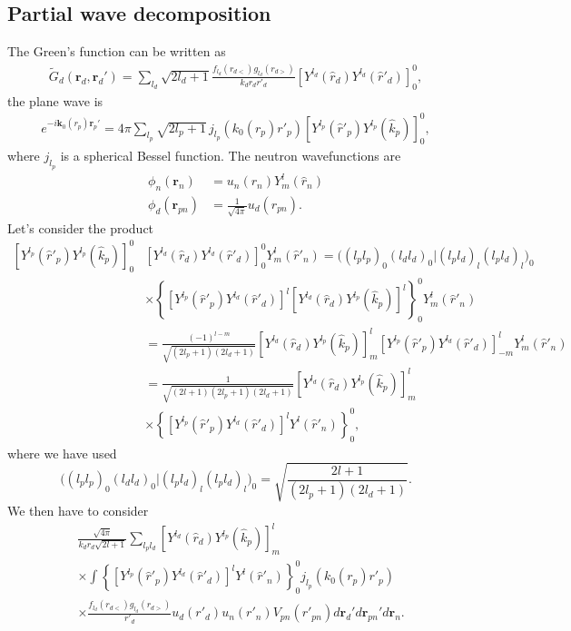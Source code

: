 \documentclass[a4paper,11pt]{article}
\begin{document}
\subsection{Partial wave decomposition}

The Green's function can be written as
\begin{align}\label{eq44}
\tilde G_d(\mathbf r_d,\mathbf r_d')=\sum_{l_d}\sqrt{2l_d+1}\frac{f_{l_d}(r_{d<})g_{l_d}(r_{d>})}{k_dr_dr'_d}\left[Y^{l_d}(\hat r_d) Y^{l_d}(\hat r'_d)\right]^0_0,
\end{align}
the plane wave is
\begin{align}\label{eq45}
e^{-i\mathbf k_0(r_p)\mathbf r_p'}=4\pi\sum_{l_p}\sqrt{2l_p+1}\,j_{l_p}(k_0(r_p) r'_p)\left[Y^{l_p}(\hat r'_p) Y^{l_p}(\hat k_p)\right]^0_0,
\end{align}
where $j_{l_p}$ is a spherical Bessel function.  The neutron wavefunctions are
\begin{align}\label{eq38}
\nonumber \phi_n(\mathbf{r}_n)&=u_n(r_n)Y^{l}_{m}(\hat r_n)\\
\phi_d(\mathbf{r}_{pn})&=\frac{1}{\sqrt{4\pi}}u_d(r_{pn}).
\end{align}
Let's consider the product
\begin{align}\label{eq46}
\nonumber\left[Y^{l_p}(\hat r'_p) Y^{l_p}(\hat k_p)\right]^0_0&\left[Y^{l_d}(\hat r_d) Y^{l_d}(\hat r'_d)\right]^0_0Y_m^l(\hat r'_n)=\bigl((l_p l_p)_0(l_d l_d)_0|(l_p l_d)_l(l_p l_d)_{l}\bigr)_0\\
\nonumber&\times \left\{\left[Y^{l_p}(\hat r'_p) Y^{l_d}(\hat r'_d)\right]^l\left[Y^{l_d}(\hat r_d) Y^{l_p}(\hat k_p)\right]^l\right\}^0_0Y_m^l(\hat r'_n)\\
\nonumber&=\frac{(-1)^{l-m}}{\sqrt{(2l_p+1)(2l_d+1)}}\left[Y^{l_d}(\hat r_d) Y^{l_p}(\hat k_p)\right]^l_m\left[Y^{l_p}(\hat r'_p) Y^{l_d}(\hat r'_d)\right]^l_{-m}Y_m^l(\hat r'_n)\\
\nonumber &=\frac{1}{\sqrt{(2l+1)(2l_p+1)(2l_d+1)}}\left[Y^{l_d}(\hat r_d) Y^{l_p}(\hat k_p)\right]^l_m\\
&\times\left\{\left[Y^{l_p}(\hat r'_p) Y^{l_d}(\hat r'_d)\right]^lY^l(\hat r'_n)\right\}^0_0,
\end{align}
where we have used
\begin{equation}\label{eq61}
\bigl((l_p l_p)_0(l_d l_d)_0|(l_p l_d)_l(l_p l_d)_{l}\bigr)_0=\sqrt{\frac{2l+1}{(2l_p+1)(2l_d+1)}}.
\end{equation}
We then have to consider
 \begin{align}\label{eq47}
\nonumber&\frac{\sqrt{4\pi}}{k_dr_d\sqrt{2l+1}}\sum_{l_pl_d} \left[Y^{l_d}(\hat r_d) Y^{l_p}(\hat k_p)\right]^l_m\\
\nonumber&\times\int \left\{\left[Y^{l_p}(\hat r'_p) Y^{l_d}(\hat r'_d)\right]^lY^l(\hat r'_n)\right\}^0_0j_{l_p}(k_0(r_p) r'_p)\\
&\times \frac{f_{l_d}(r_{d<})g_{l_d}(r_{d>})}{r'_d}  u_d(r'_d)u_n(r'_n)V_{pn}(r'_{pn}) d\mathbf r_d' d\mathbf r_{pn}'d\mathbf r_n.
 \end{align}
\end{document}
